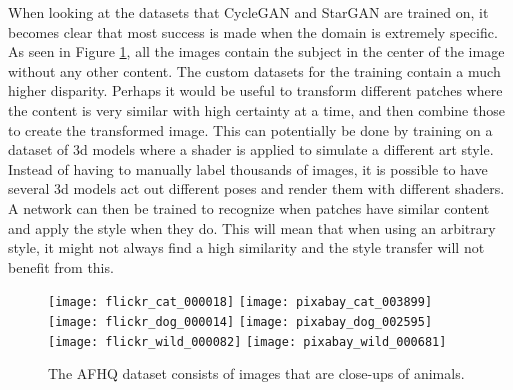 When looking at the datasets that CycleGAN and StarGAN are trained on, it becomes clear that most success is made when the domain is extremely specific.
As seen in Figure \ref{fig:AFHQ}, all the images contain the subject in the center of the image without any other content.
The custom datasets for the training contain a much higher disparity.
Perhaps it would be useful to transform different patches where the content is very similar with high certainty at a time, and then combine those to create the transformed image.
This can potentially be done by training on a dataset of 3d models where a shader is applied to simulate a different art style.
Instead of having to manually label thousands of images, it is possible to have several 3d models act out different poses and render them with different shaders.
A network can then be trained to recognize when patches have similar content and apply the style when they do.
This will mean that when using an arbitrary style, it might not always find a high similarity and the style transfer will not benefit from this.
\\

\begin{figure}[h]
	\centering
    \texttt{[image: flickr\_cat\_000018]}
    \texttt{[image: pixabay\_cat\_003899]}
    \texttt{[image: flickr\_dog\_000014]}
    \texttt{[image: pixabay\_dog\_002595]}
    \texttt{[image: flickr\_wild\_000082]}
    \texttt{[image: pixabay\_wild\_000681]}
	\caption{The \gls{AFHQ} dataset consists of images that are close-ups of animals.}
	\label{fig:AFHQ}
\end{figure}